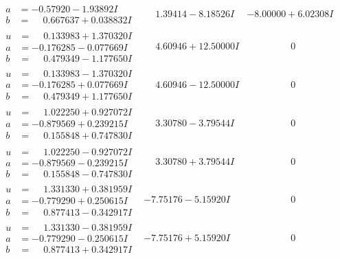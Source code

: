 \documentclass[1p]{elsarticle_modified}
\theoremstyle{definition}
\begin{document}
$$\begin{array}{c|c|c}
\begin{aligned}
a &= -0.57920 - 1.93892 I \\
b &= \phantom{-}0.667637 + 0.038832 I\end{aligned}
 & \phantom{-}1.39414 - 8.18526 I & -8.00000 + 6.02308 I \\ \hline\begin{aligned}
u &= \phantom{-}0.133983 + 1.370320 I \\
a &= -0.176285 - 0.077669 I \\
b &= \phantom{-}0.479349 - 1.177650 I\end{aligned}
 & \phantom{-}4.60946 + 12.50000 I & \phantom{-0.000000 } 0 \\ \hline\begin{aligned}
u &= \phantom{-}0.133983 - 1.370320 I \\
a &= -0.176285 + 0.077669 I \\
b &= \phantom{-}0.479349 + 1.177650 I\end{aligned}
 & \phantom{-}4.60946 - 12.50000 I & \phantom{-0.000000 } 0 \\ \hline\begin{aligned}
u &= \phantom{-}1.022250 + 0.927072 I \\
a &= -0.879569 + 0.239215 I \\
b &= \phantom{-}0.155848 + 0.747830 I\end{aligned}
 & \phantom{-}3.30780 - 3.79544 I & \phantom{-0.000000 } 0 \\ \hline\begin{aligned}
u &= \phantom{-}1.022250 - 0.927072 I \\
a &= -0.879569 - 0.239215 I \\
b &= \phantom{-}0.155848 - 0.747830 I\end{aligned}
 & \phantom{-}3.30780 + 3.79544 I & \phantom{-0.000000 } 0 \\ \hline\begin{aligned}
u &= \phantom{-}1.331330 + 0.381959 I \\
a &= -0.779290 + 0.250615 I \\
b &= \phantom{-}0.877413 - 0.342917 I\end{aligned}
 & -7.75176 - 5.15920 I & \phantom{-0.000000 } 0 \\ \hline\begin{aligned}
u &= \phantom{-}1.331330 - 0.381959 I \\
a &= -0.779290 - 0.250615 I \\
b &= \phantom{-}0.877413 + 0.342917 I\end{aligned}
 & -7.75176 + 5.15920 I & \phantom{-0.000000 } 0 \\ \hline\begin{aligned}

\end{aligned}
\end{array}$$
\end{document}
